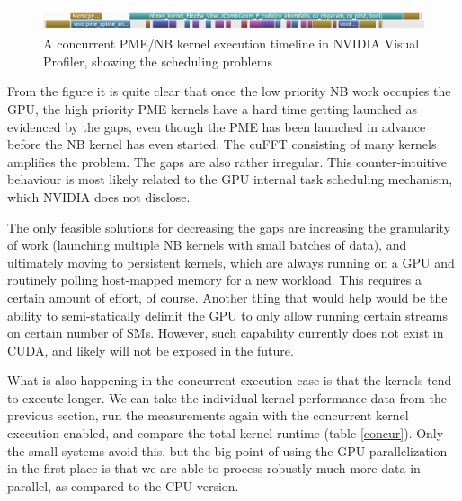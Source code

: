 \documentclass[12pt,a4paper,notitlepage]{report}
\begin{document}
\FloatBarrier
\begin{figure} [h!]
    \centering
    \includegraphics[width=1\textwidth]{pics/overlap-crop.png}
    \caption{A concurrent PME/NB kernel execution timeline in NVIDIA Visual Profiler, showing the scheduling problems}
    \label{fig:overlap}
\end{figure}
\FloatBarrier

From the figure it is quite clear that once the low priority NB work occupies the GPU, the high priority PME kernels have a hard time getting launched as evidenced by the gaps, even though the PME has been launched in advance before the NB kernel has even started. The cuFFT consisting of many kernels amplifies the problem. The gaps are also rather irregular. This counter-intuitive behaviour is most likely related to the GPU internal task scheduling mechanism, which NVIDIA does not disclose. 

The only feasible solutions for decreasing the gaps are increasing the granularity of work (launching multiple NB kernels with small batches of data), and ultimately moving to persistent kernels, which are always running on a GPU and routinely polling host-mapped memory for a new workload. This requires a certain amount of effort, of course. Another thing that would help would be the ability to semi-statically delimit the GPU to only allow running certain streams on certain number of SMs. However, such capability currently does not exist in CUDA, and likely will not be exposed in the future.

\iffalse
 What is also happening in the concurrent execution case is that the kernels tend to execute longer. We can take the individual kernel performance data from the previous section, run the measurements again with the concurrent kernel execution enabled, and compare the total kernel runtime (table \ref{concur}). Only the small systems avoid this, but the big point of using the GPU parallelization in the first place is that we are able to process robustly much more data in parallel, as compared to the CPU version. 
 
\end{document}
